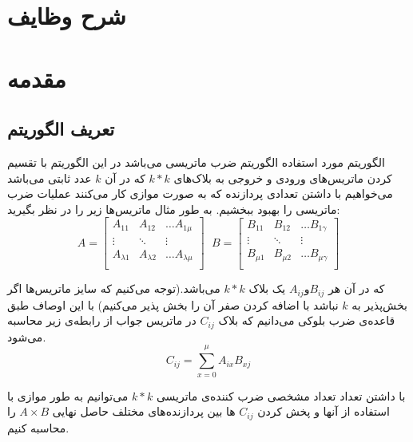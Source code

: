 \documentclass[12pt,onecolumn,a4paper,fleqn]{article}
\begin{document}
\pagebreak

\tableofcontents
\thispagestyle{empty}
\pagebreak


\section*{شرح وظایف}


\pagebreak



\section{مقدمه}
	
	\subsection{تعریف الگوریتم}
	الگوریتم مورد استفاده الگوریتم ضرب ماتریسی  می‌باشد در این الگوریتم با تقسیم کردن ماتریس‌های ورودی و خروجی به بلاک‌های $k*k$ که در آن $k$ عدد ثابتی می‌باشد می‌خواهیم با داشتن تعدادی پردازنده‌ که به صورت موازی کار می‌کنند عملیات ضرب ماتریسی را بهبود ببخشیم. به طور مثال ماتریس‌ها زیر را در نظر بگیرید:
	\begin{equation}
	A = \begin{bmatrix}
	A_{11}& A_{12}& \dots A_{1\mu}\\
	\vdots& \ddots& \vdots\\
	A_{\lambda1}& A_{\lambda2}& \dots A_{\lambda\mu}\\
	\end{bmatrix} 
	\ \ \, 
	B = \begin{bmatrix}
	B_{11}& B_{12}& \dots B_{1\gamma}\\
	\vdots& \ddots& \vdots\\
	B_{\mu1}& B_{\mu2}& \dots B_{\mu\gamma}\\
	\end{bmatrix} 
	\end{equation}
	
	که در آن هر $A_{ij} و B_{ij}$ یک بلاک $k*k$ می‌باشد.(توجه می‌کنیم که  سایز‌ ماتریس‌ها اگر بخش‌‌پذیر به $k$ نباشد با اضافه‌ کردن صفر آن را بخش پذیر می‌کنیم) با این اوصاف طبق قاعده‌ی ضرب بلوکی می‌دانیم که بلاک $C_{ij}$ در ماتریس جواب از رابطه‌ی زیر محاسبه می‌شود.
	\begin{equation}
	C_{ij} = \sum_{x=0}^\mu A_{ix}B_{xj}
	\label{1}
	\end{equation}
	
	با داشتن تعداد تعداد مشخصی ضرب کننده‌ی ماتریسی $k*k$ می‌توانیم  به طور موازی با استفاده از آنها  و پخش ‌کردن $C_{ij}$ ها بین پردازنده‌های مختلف حاصل نهایی $A\times B$ را محاسبه کنیم. 
\end{document}
